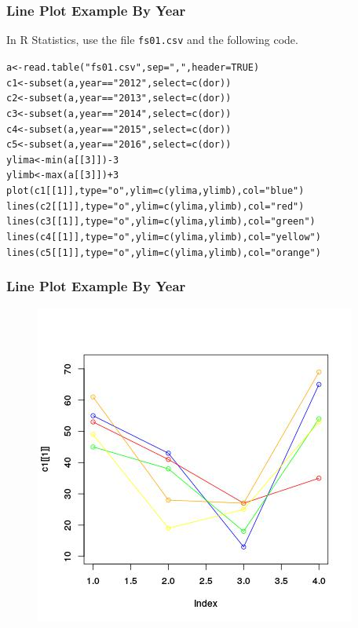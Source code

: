 \documentclass[xcolor=dvipsnames]{beamer}
\begin{document}

\begin{frame}
  \frametitle{Line Plot Example By Year}
In R Statistics, use the file \texttt{fs01.csv} and the following
code.
\begin{alltt}
\small
a<-read.table("fs01.csv",sep=",",header=TRUE)\newline
c1<-subset(a,year=="2012",select=c(dor))\newline
c2<-subset(a,year=="2013",select=c(dor))\newline
c3<-subset(a,year=="2014",select=c(dor))\newline
c4<-subset(a,year=="2015",select=c(dor))\newline
c5<-subset(a,year=="2016",select=c(dor))\newline
ylima<-min(a[[3]])-3\newline
ylimb<-max(a[[3]])+3\newline
plot(c1[[1]],type="o",ylim=c(ylima,ylimb),col="blue")\newline
lines(c2[[1]],type="o",ylim=c(ylima,ylimb),col="red")\newline
lines(c3[[1]],type="o",ylim=c(ylima,ylimb),col="green")\newline
lines(c4[[1]],type="o",ylim=c(ylima,ylimb),col="yellow")\newline
lines(c5[[1]],type="o",ylim=c(ylima,ylimb),col="orange")
\end{alltt}
\end{frame}

\begin{frame}
  \frametitle{Line Plot Example By Year}
\begin{figure}[h]
\includegraphics[scale=.6]{./diagrams/lineplot2.jpg}
\end{figure}
\end{frame}
\end{document}
